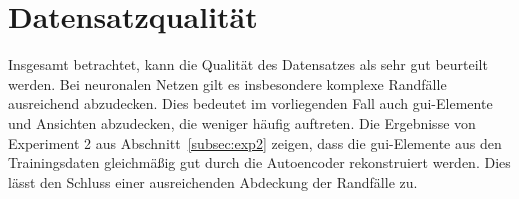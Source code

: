 

\section{Datensatzqualität}

Insgesamt betrachtet, kann die Qualität des Datensatzes als sehr gut beurteilt werden. Bei neuronalen Netzen gilt es insbesondere komplexe Randfälle ausreichend abzudecken. Dies bedeutet im vorliegenden Fall auch \gls{gui}-Elemente und Ansichten abzudecken, die weniger häufig auftreten. Die Ergebnisse von Experiment 2 aus Abschnitt~\ref{subsec:exp2} zeigen, dass die \gls{gui}-Elemente aus den Trainingsdaten gleichmäßig gut durch die Autoencoder rekonstruiert werden. Dies lässt den Schluss einer ausreichenden Abdeckung der Randfälle zu.

